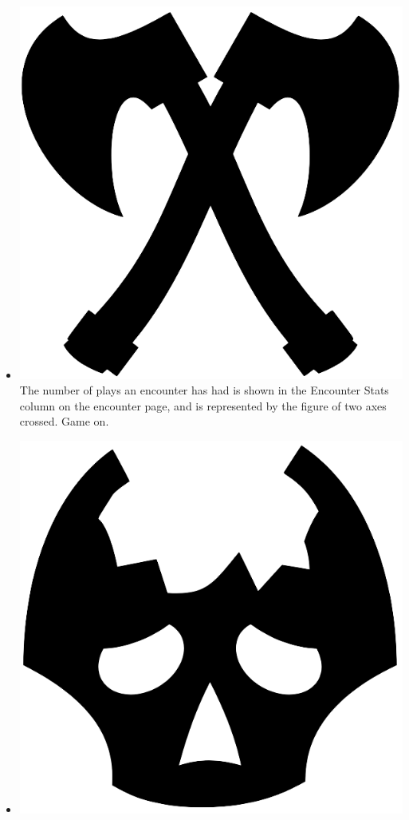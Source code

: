 \documentclass[12pt,a4paper]{report}
\begin{document}
\begin{itemize}
		\item \includegraphics[scale=.03]{plays_icon}
		The number of plays an encounter has had is shown in the Encounter Stats column on the encounter page, and is represented by the figure of two axes crossed. Game on.
		\begin{figure}
			\label{fig: Encounter Plays Icon}
		\end{figure}
		\item \includegraphics[scale=.03]{pc_deaths}

\end{itemize}
\end{document}
